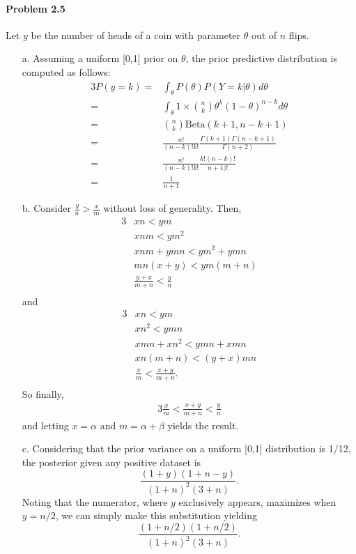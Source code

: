 \documentclass[10pt]{article}
\begin{document}
\paragraph{Problem 2.5} Let $y$ be the number of heads of a coin with parameter $\theta$ out of $n$ flips.

\begin{enumerate}
\item[a.] Assuming a uniform [0,1] prior on $\theta$, the prior predictive distribution is computed as follows:
\begin{alignat*}{3}
P(y=k)=& \int_\theta P(\theta) P(Y=k|\theta) d\theta \\
=& \int_\theta 1 \times \binom{n}{k} \theta^k (1-\theta)^{n-k} d\theta \\
=& \binom{n}{k} \text{Beta}(k+1, n-k+1) \\
=& \frac{n!}{(n-k)!k!} \frac{\Gamma(k+1)\Gamma(n-k+1)}{\Gamma(n+2)} \\
=&\frac{n!}{(n-k)!k!}\frac{k!(n-k)!}{n+1)!} \\
=& \frac{1}{n+1}
\end{alignat*}
\item[b.] Consider $\frac{y}{n} > \frac{x}{m}$ without loss of generality. Then,
\begin{alignat*}{3}
 & xn < ym \\
 & xnm < ym^2 \\
 & xnm+ymn < ym^2 + ymn \\
 & mn(x+y) < ym(m+n) \\
 & \frac{y+x}{m+n}<\frac{y}{n} \\
\end{alignat*}
and
\begin{alignat*}{3}
 & xn < ym \\
 & xn^2 < ymn \\
 & xmn + xn^2 < ymn + xmn \\
 & xn(m+n) < (y+x)mn \\
 & \frac{x}{m}<\frac{x+y}{m+n}. \\
\end{alignat*}
 So finally,
\begin{alignat*}{3}
\frac{x}{m}<\frac{x+y}{m+n} <\frac{y}{n}
\end{alignat*}
and letting $x=\alpha$ and $m=\alpha + \beta$ yields the result.

\item[c.] Considering that the prior variance on a uniform [0,1] distribution is 1/12, the posterior given any positive dataset is
$$\frac{(1+y)(1+n-y)}{(1+n)^2(3+n)}.$$ Noting that the numerator, where $y$ exclusively appears, maximizes when $y=n/2$, we can simply make this substitution yielding $$\frac{(1+n/2)(1+n/2)}{(1+n)^2(3+n)}.$$


\end{enumerate}
\end{document}
